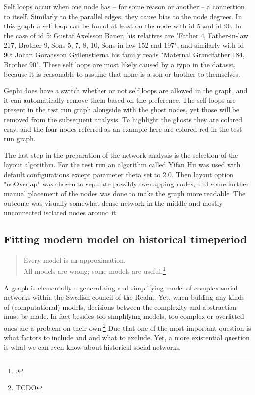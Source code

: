 Self loops occur when one node has – for some reason or another – a connection to itself. Similarly to the parallel edges, they cause bias to the node degrees. In this graph a self loop can be found at least on the node with id 5 and id 90. In the case of id 5: Gustaf Axelsson Baner, his relatives are "Father 4, Father-in-law 217, Brother 9, Sons 5, 7, 8, 10, Sons-in-law 152 and 197", and similarly with id 90: Johan Göransson Gyllenstierna his family reads "Maternal Grandfather 184, Brother 90". These self loops are most likely caused by a typo in the dataset, because it is reasonable to assume that none is a son or brother to themselves.
 
Gephi does have a switch whether or not self loops are allowed in the graph, and it can automatically remove them based on the preference. The self loops are present in the test run graph alongside with the ghost nodes, yet those will be removed from the subsequent analysis. To highlight the ghosts they are colored cray, and the four nodes referred as an example here are colored red in the test run graph.

The last step in the preparation of the network analysis is the selection of the layout algorithm. For the test run an algorithm called Yifan Hu was used with default configurations except parameter theta set to 2.0. Then layout option "noOverlap" was chosen to separate possibly overlapping nodes, and some further manual placement of the nodes was done to make the graph more readable. The outcome was visually somewhat dense network in the middle and mostly unconnected isolated nodes around it. 

\subsection{Fitting modern model on historical timeperiod}
\begin{quote}
	Every model is an approximation.\\
	All models are wrong; some models are useful.\footcite[prefix]{statisticsfor}
\end{quote}

A graph is elementally a generalizing and simplifying model of complex social networks within the Swedish council of the Realm. Yet, when bulding any kinds of (computational) models, decisions between the complexity and abstraction must be made. In fact besides too simplifying models, too complex or overfitted ones are a problem on their own.\footnote{TODO} Due that one of the most important question is what factors to include and and what to exclude. Yet, a more existential question is what we can even know about historical social networks. 

